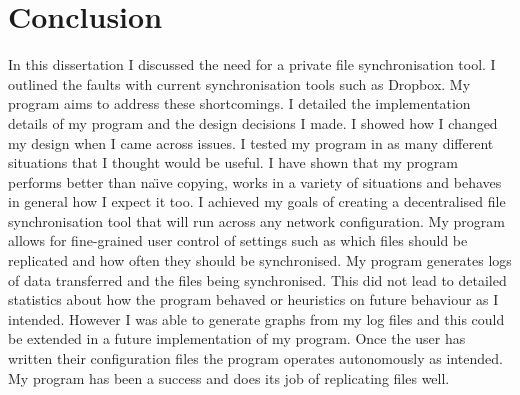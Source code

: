 \documentclass[12pt]{article}
\begin{document}
\newpage
\section{Conclusion}
In this dissertation I discussed the need for a private file
synchronisation tool. I outlined the faults with
current synchronisation tools such as Dropbox. My program
aims to address these shortcomings. I detailed the
implementation details of my program and the design
decisions I made. I showed how I changed my design
when I came across issues.
I tested my program in as many different situations that
I thought would be useful. I have shown that my program
performs better than na\"{\i}ve copying,
works in a variety of situations and behaves in general
how I expect it too.
I achieved my goals of creating a decentralised
file synchronisation tool that will run across any network configuration.
My program allows for fine-grained user control
of settings such as which files should be replicated and how
often they should be synchronised. My program generates
logs of data transferred and the files being synchronised.
This did not lead to detailed statistics about how
the program behaved or heuristics on future behaviour
as I intended. However I was able to generate
graphs from my log files and this could be extended in
a future implementation of my program. Once the user
has written their configuration files the program
operates autonomously as intended. My program has
been a success and does its job of replicating
files well.

\end{document}
